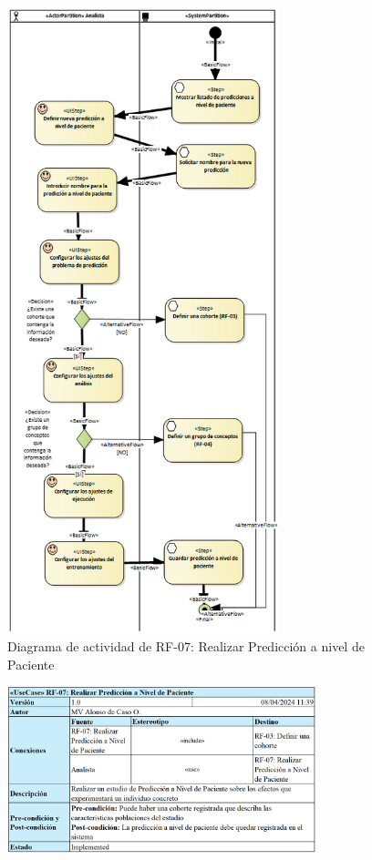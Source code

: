 \begin{figure}[H]
    \centering
    \includegraphics[width=0.70\textwidth]{figures/FR07.png}
    \caption{Diagrama de actividad de RF-07: Realizar Predicción a nivel de Paciente}
    \label{fig:FR07}
\end{figure}

\begin{figure}[H]
    \centering
    \includegraphics[width=0.80\textwidth]{tables/RF07tab.png}
    \label{table:RF07tab}
\end{figure}


